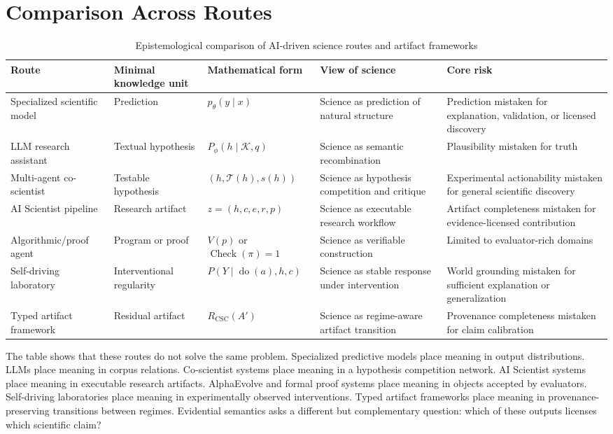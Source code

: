 \documentclass[11pt,a4paper]{article}
\newcommand{\doop}{\operatorname{do}}
\newcommand{\Know}{\mathcal{K}}
\begin{document}
\section{Comparison Across Routes}

\begin{table}[htbp]
\centering
\small
\caption{Epistemological comparison of AI-driven science routes and artifact frameworks}
\begin{tabularx}{\textwidth}{@{}p{2.9cm}Y Y Y Y@{}}
\toprule
Route & Minimal knowledge unit & Mathematical form & View of science & Core risk \\
\midrule
Specialized scientific model & Prediction & $p_\theta(y\mid x)$ & Science as prediction of natural structure & Prediction mistaken for explanation, validation, or licensed discovery \\
LLM research assistant & Textual hypothesis & $P_\phi(h\mid \Know,q)$ & Science as semantic recombination & Plausibility mistaken for truth \\
Multi-agent co-scientist & Testable hypothesis & $(h,\mathcal{T}(h),s(h))$ & Science as hypothesis competition and critique & Experimental actionability mistaken for general scientific discovery \\
AI Scientist pipeline & Research artifact & $z=(h,c,e,r,p)$ & Science as executable research workflow & Artifact completeness mistaken for evidence-licensed contribution \\
Algorithmic/proof agent & Program or proof & $V(p)$ or $\operatorname{Check}(\pi)=1$ & Science as verifiable construction & Limited to evaluator-rich domains \\
Self-driving laboratory & Interventional regularity & $P(Y\mid \doop(a),h,c)$ & Science as stable response under intervention & World grounding mistaken for sufficient explanation or generalization \\
Typed artifact framework & Residual artifact & $R_{\mathrm{CSC}}(A')$ & Science as regime-aware artifact transition & Provenance completeness mistaken for claim calibration \\
\bottomrule
\end{tabularx}
\end{table}

The table shows that these routes do not solve the same problem. Specialized predictive models place meaning in output distributions. LLMs place meaning in corpus relations. Co-scientist systems place meaning in a hypothesis competition network. AI Scientist systems place meaning in executable research artifacts. AlphaEvolve and formal proof systems place meaning in objects accepted by evaluators. Self-driving laboratories place meaning in experimentally observed interventions. Typed artifact frameworks place meaning in provenance-preserving transitions between regimes. Evidential semantics asks a different but complementary question: which of these outputs licenses which scientific claim?
\end{document}
